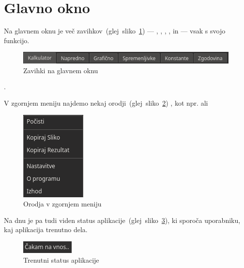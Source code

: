 \documentclass[12pt]{report}
\begin{document}
	\section{Glavno okno}
	\label{mainwindow}
		\parbox{\textwidth}{
		Na glavnem oknu je več zavihkov~(glej~sliko~\ref{fig:mw_tabs}) ---
		, , , ,  in 
		--- vsak s svojo funkcijo.
		\begin{figure}[H]
			\centering
			\includegraphics{mw_tabs.png}
			\caption{Zavihki na glavnem oknu}
			\label{fig:mw_tabs}
		\end{figure}.}
		\parbox{\textwidth}{
		V zgornjem meniju najdemo nekaj orodji~(glej~sliko~\ref{fig:tools}) , kot npr.  ali 
		\begin{figure}[H]
			\centering
			\includegraphics{tools.png}
			\caption{Orodja v zgornjem meniju}
			\label{fig:tools}
		\end{figure}}
		\parbox{\textwidth}{
		Na dnu je pa tudi viden status aplikacije~(glej~sliko~\ref{fig:mw_status}), ki sporoča uporabniku, kaj aplikacija trenutno dela.
		\begin{figure}[H]
			\centering
			\includegraphics{mw_status.png}
			\caption{Trenutni status aplikacije}
			\label{fig:mw_status}
		\end{figure}}
\end{document}
